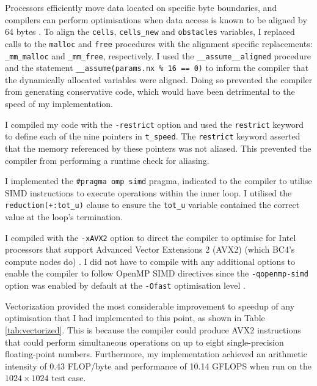 \documentclass[twocolumn, a4paper]{article}
\begin{document}
Processors efficiently move data located on specific byte boundaries, and compilers can perform optimisations when data access is known to be aligned by 64 bytes \cite{alignment}.
To align the \texttt{cells}, \texttt{cells\_new} and \texttt{obstacles} variables, I replaced calls to the \texttt{malloc} and \texttt{free} procedures with the alignment specific replacements: \texttt{\_mm\_malloc} and \texttt{\_mm\_free}, respectively.
I used the \texttt{\_\_assume\_\_aligned} procedure and  the statement \texttt{\_\_assume(params.nx \% 16 == 0)} to inform the compiler that the dynamically allocated variables were aligned.
Doing so prevented the compiler from generating conservative code, which would have been detrimental to the speed of my implementation.

I compiled my code with the \texttt{-restrict} option and used the \texttt{restrict} keyword to define each of the nine pointers in \texttt{t\_speed}.
The \texttt{restrict} keyword asserted that the memory referenced by these pointers was not aliased.
This prevented the compiler from performing a runtime check for aliasing.

I implemented the \texttt{\#pragma omp simd} pragma, indicated to the compiler to utilise SIMD instructions to execute operations within the inner loop.
I utilised the \texttt{reduction(+:tot\_u)} clause to ensure the \texttt{tot\_u} variable contained the correct value at the loop's termination.

I compiled with the \texttt{-xAVX2} option to direct the compiler to optimise for Intel processors that support Advanced Vector Extensions 2 (AVX2) (which BC4's compute nodes do) \cite{lenovo}.
I did not have to compile with any additional options to enable the compiler to follow OpenMP SIMD directives since the \texttt{-qopenmp-simd} option was enabled by default at the \texttt{-Ofast} optimisation level \cite{icc}.

Vectorization provided the most considerable improvement to speedup of any optimisation that I had implemented to this point, as shown in Table \ref{tab:vectorized}.
This is because the compiler could produce AVX2 instructions that could perform simultaneous operations on up to eight single-precision floating-point numbers.
Furthermore, my implementation achieved an arithmetic intensity of 0.43 FLOP/byte and performance of 10.14 GFLOPS when run on the $1024\times1024$ test case.
\end{document}
